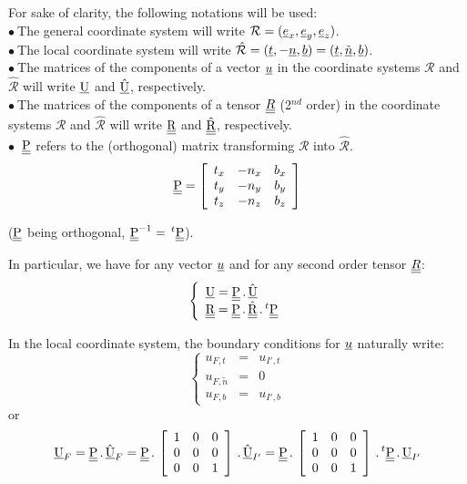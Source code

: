 For sake of clarity, the following notations will be used:\\
$\bullet\ $The general coordinate system will write
$\mathcal{R}=(\underline{e}_x,\underline{e}_y,\underline{e}_z)$.\\
$\bullet\ $The local coordinate system will write
$\hat{\mathcal{R}}=(\underline{t},-\underline{n},\underline{b})=(\underline{t},\underline{\tilde{n}},\underline{b})$.\\
$\bullet\ $The matrices of the components of a vector $\underline{u}$
in the coordinate systems
$\mathcal{R}$ and $\hat{\mathcal{R}}$ will write
$\underline{\textrm{U}}$ and $\hat{\underline{\textrm{U}}}$, respectively.\\
$\bullet\ $The matrices of the components of a tensor $\underline{\underline{R}}$ (2$^{nd}$ order)
in the coordinate systems $\mathcal{R}$ and $\hat{\mathcal{R}}$ will write
 $\underline{\underline{\textrm{R}}}$ and $\hat{\underline{\underline{\textrm{R}}}}$, respectively.\\
$\bullet\ $ $\underline{\underline{\textrm{P}}}$ refers to the (orthogonal) matrix transforming
 $\mathcal{R}$ into $\hat{\mathcal{R}}$.
\begin{equation}
\underline{\underline{\textrm{P}}}=\left[
\begin{array}{ccc}
t_x & -n_x & b_x\\
t_y & -n_y & b_y\\
t_z & -n_z & b_z
\end{array}\right]
\end{equation}

($\underline{\underline{\textrm{P}}}$ being orthogonal, $\underline{\underline{\textrm{P}}}^{-1}=\,^t\underline{\underline{\textrm{P}}}$).

In particular, we have for any vector $\underline{u}$
and for any second order tensor $\underline{\underline{R}}$:\\
\begin{equation}
\left\{\begin{array}{l}
\underline{\textrm{U}} = \underline{\underline{\textrm{P}}}\,.\,\hat{\underline{\textrm{U}}}\\
\underline{\underline{\textrm{R}}}= \underline{\underline{\textrm{P}}}\,.\,\hat{\underline{\underline{\textrm{R}}}}\,.\,^t\underline{\underline{\textrm{P}}}
\end{array}\right.
\end{equation}

In the local coordinate system, the boundary conditions for $\underline{u}$
naturally write:\\
\begin{equation}
\left\{\begin{array}{lcl}
u_{F,t} & = & u_{I',t}\\
u_{F,\tilde{n}} & = & 0\\
u_{F,b} & = & u_{I',b}
\end{array}\right.
\end{equation}
or
\begin{equation}
\underline{\textrm{U}}_F = \underline{\underline{\textrm{P}}}\,.\,\hat{\underline{\textrm{U}}}_F
= \underline{\underline{\textrm{P}}}\,.\,\left[
\begin{array}{ccc}
1 & 0 & 0\\
0 & 0 & 0\\
0 & 0 & 1
\end{array}
\right]\,.\,\hat{\underline{\textrm{U}}}_{I'}
=\underline{\underline{\textrm{P}}}\,.\,\left[
\begin{array}{ccc}
1 & 0 & 0\\
0 & 0 & 0\\
0 & 0 & 1
\end{array}
\right]\,.\,^t\underline{\underline{\textrm{P}}}\,.\,\underline{\textrm{U}}_{I'}
\end{equation}


